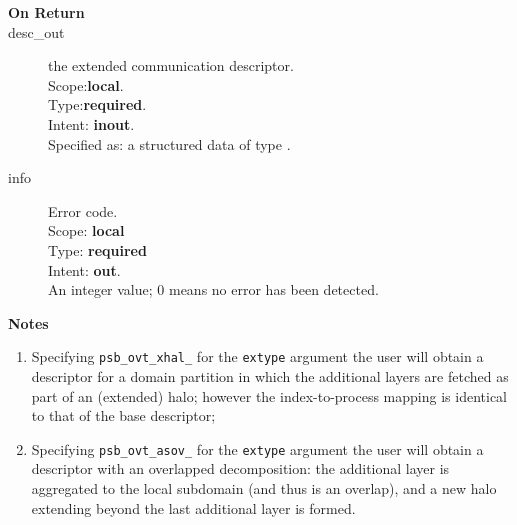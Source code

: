 \begin{description}
\item[\bf On Return]
\item[desc\_out] the extended communication descriptor.\\
Scope:{\bf local}.\\
Type:{\bf required}.\\
Intent: {\bf inout}.\\
Specified as: a structured data of type \descdata.
\item[info] Error code.\\
Scope: {\bf local} \\
Type: {\bf required} \\
Intent: {\bf out}.\\
An integer value; 0 means no error has been detected. 
\end{description}

{\par\noindent\large\bfseries Notes}
\begin{enumerate}
\item Specifying \verb|psb_ovt_xhal_| for the \verb|extype| argument
  the user will obtain a descriptor for a domain partition in which
  the additional layers are fetched as part of an (extended) halo;
  however the index-to-process mapping is identical to that of the
  base descriptor;
\item Specifying \verb|psb_ovt_asov_| for the \verb|extype| argument
  the user will obtain a descriptor with an overlapped decomposition:
  the additional layer is aggregated to  the local subdomain (and thus
  is an overlap), and a new halo extending beyond the last additional
  layer is formed. 
\end{enumerate}




